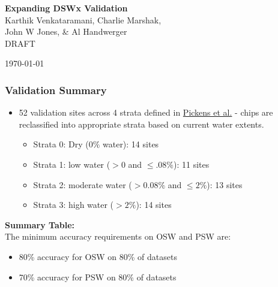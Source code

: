 \documentclass[8pt]{beamer}
\begin{document}
\begin{frame}
\begin{center}
\textbf{Expanding DSWx Validation}\\
\vspace{.5cm}
Karthik Venkataramani, Charlie Marshak, \\John W Jones, \& Al Handwerger \\
DRAFT

\today\\
\end{center}
\end{frame}
\begin{frame}
\frametitle{Validation Summary}
\tiny
\begin{itemize}
\item 52 validation sites across 4 strata defined in \href{https://www.sciencedirect.com/science/article/pii/S0034425720301620}{Pickens et al.} - chips are reclassified into appropriate strata based on current water extents.
\begin{itemize}
\tiny
\item Strata 0: Dry (0$\%$ water): 14 sites
\item Strata 1: low water ($>0$ and $\leq.08\%$): 11 sites
\item Strata 2: moderate  water ($>0.08\%$ and $\leq 2\%$): 13 sites
\item Strata 3: high water ($>2\%$): 14 sites
\end{itemize}
\end{itemize}

\vfill
\textbf{Summary Table:}
 \\[2\baselineskip]

The minimum accuracy requirements on OSW and PSW are:
\begin{itemize}
\item 80\% accuracy for OSW on 80\% of datasets
\item 70\% accuracy for PSW on 80\% of datasets
\end{itemize}


\begin{center}

\end{center}

\end{frame}
\end{document}

